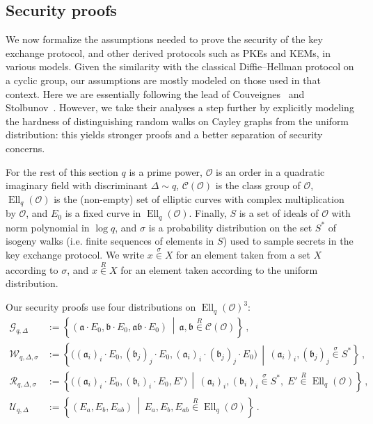 \documentclass{llncs}
\newcommand{\Cl}{\mathcal{C}}
\renewcommand{\O}{\mathcal{O}}
\newcommand{\suchthat}{\,\middle\vert\,}
\renewcommand{\frak}{\mathfrak}
\newcommand{\rand}[1]{\overset{#1}{∈}}
\newcommand{\uni}{\rand{R}}
\DeclareMathOperator{\Ell}{Ell}
\begin{document}
\subsection{Security proofs}
\label{sec:proofs}

We now formalize the assumptions needed to prove the security of the
key exchange protocol, and other derived protocols such as PKEs and
KEMs, in various models. Given the similarity with the classical
Diffie--Hellman protocol on a cyclic group, our assumptions are
mostly modeled on those used in that context. Here we are
essentially following the lead of
Couveignes~\cite{cryptoeprint:2006:291} and
Stolbunov~\cite{Stol,Stolbunov2012}.
However, we take their analyses a
step further by explicitly modeling the hardness of distinguishing
random walks on Cayley graphs from the uniform distribution: this
yields stronger proofs and a better separation of security concerns.

For the rest of this section $q$ is a prime power, $\O$ is an order in
a quadratic imaginary field with discriminant $Δ\sim q$, $\Cl(\O)$ is
the class group of $\O$, $\Ell_q(\O)$ is the (non-empty) set of
elliptic curves with complex multiplication by $\O$, and $E_0$ is a
fixed curve in $\Ell_q(\O)$. Finally, $S$ is a set of ideals of $\O$
with norm polynomial in $\log q$, and $σ$ is a probability
distribution on the set $S^*$ of isogeny walks (i.e. finite
sequences of elements in $S$) used to sample secrets in the key exchange
protocol.  
We write $x\rand{σ} X$ for an element taken from a set $X$
according to $σ$, 
and %
$x\uni X$ for an element taken according to the uniform distribution.

Our security proofs use four distributions on $\Ell_q(\O)^3$:
\begin{align*}
    \mathcal{G}_{q,Δ} 
    & := 
    \left\{
        (\frak a·E_0,\frak b·E_0,\frak{ab}·E_0)
        \suchthat 
        \frak a,\frak b\uni\Cl(\O)
    \right\}
    \,, \\
    \mathcal{W}_{q,Δ,σ} 
    & := 
    \left\{
        \bigl((\frak a_i)_i·E_0,(\frak b_j)_j·E_0,(\frak a_i)_i·(\frak b_j)_j·E_0\bigr)
        \suchthat 
        (\frak a_i)_i,(\frak b_j)_j\rand{σ}S^*
    \right\}
    \,, \\
    \mathcal{R}_{q,Δ,σ} 
    & := 
    \left\{
        \bigl((\frak a_i)_i·E_0,(\frak b_i)_i·E_0,E'\bigr)
        \suchthat
        (\frak a_i)_i,(\frak b_i)_i\rand{σ}S^*,\; E'\uni\Ell_q(\O)
    \right\}
    \,, \\
    \mathcal{U}_{q,Δ} 
    & :=
    \left\{
        (E_a,E_b,E_{ab}) 
        \suchthat 
        E_a,E_b,E_{ab}\uni\Ell_q(\O)
    \right\}
    \,.
\end{align*}
\end{document}
